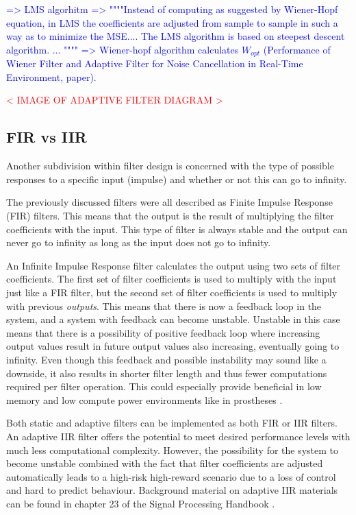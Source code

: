 \textcolor{blue}{
=> LMS algorhitm
=> """"Instead of computing as suggested by
Wiener-Hopf equation, in LMS the coefficients are adjusted
from sample to sample in such a way as to minimize the MSE.... The LMS algorithm is based on steepest descent algorithm. ... """" => Wiener-hopf algorithm calculates $W_{opt}$ (Performance of Wiener Filter and Adaptive Filter for Noise Cancellation in Real-Time Environment, paper).}

\textcolor{red}{< IMAGE OF ADAPTIVE FILTER DIAGRAM >}

\subsection{FIR vs IIR}
Another subdivision within filter design is concerned with the type of possible responses to a specific input (impulse) and whether or not this can go to infinity.

The previously discussed filters were all described as Finite Impulse Response (FIR) filters. This means that the output is the result of multiplying the filter coefficients with the input. This type of filter is always stable and the output can never go to infinity as long as the input does not go to infinity.

An Infinite Impulse Response filter calculates the output using two sets of filter coefficients. The first set of filter coefficients is used to multiply with the input just like a FIR filter, but the second set of filter coefficients is used to multiply with previous \textit{outputs}. This means that there is now a feedback loop in the system, and a system with feedback can become unstable. Unstable in this case means that there is a possibility of positive feedback loop where increasing output values result in future output values also increasing, eventually going to infinity. Even though this feedback and possible instability may sound like a downside, it also results in shorter filter length and thus fewer computations required per filter operation. This could especially provide beneficial in low memory and low compute power environments like in prostheses \cite{fir_vs_iir}.

Both static and adaptive filters can be implemented as both FIR or IIR filters. An adaptive IIR filter offers the potential to meet desired performance levels with much less computational complexity. However, the possibility for the system to become unstable combined with the fact that filter coefficients are adjusted automatically leads to a high-risk high-reward scenario due to a loss of control and hard to predict behaviour. Background material on adaptive IIR materials can be found in chapter 23 of the Signal Processing Handbook \cite{digital_signal_processing_handbook}.

